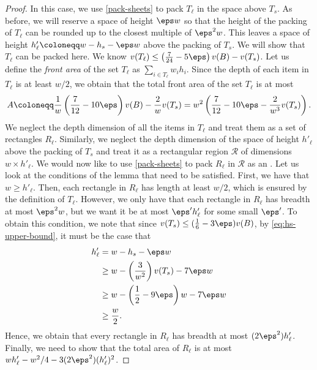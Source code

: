 \begin{proof}
In this case, we use \cref{pack-sheets} to pack $T_\ell$ in the space above $T_s$.
As before, we will reserve a space of height $\eps w$ so that the height of the packing of $T_{\ell}$
can be rounded up to the closest multiple of $\eps^2 w$. This leaves a space of height 
$h'_{\ell}\coloneqq w-h_s-\eps w$ above the packing of $T_s$. We will show that $T_{\ell}$ can be packed here.
We know $v(T_\ell)\le \left(\frac{7}{24}-5\eps\right)v(B)-v(T_s)$.
Let us define the \emph{front area} of the set $T_\ell$ as $\sum_{i\in T_\ell}w_ih_i$.
Since the depth of each item in $T_\ell$ is at least $w/2$, we obtain that the total front area of the set $T_\ell$
is at most 
\begin{align*}
    A\coloneqq \frac{1}{w}\left(\frac{7}{12}-10\eps\right)v(B)-\frac{2}{w}v(T_s)=w^2\left(\frac{7}{12}-10\eps-\frac{2}{w^3}v(T_s)\right).
\end{align*}
We neglect the depth dimension of all the items in $T_\ell$ and treat them as a set of rectangles $R_\ell$. Similarly,
we neglect the depth dimension of the space of height $h'_{\ell}$ above the packing of $T_s$ and treat it as a rectangular region $\mathcal R$
of dimensions $w\times h'_{\ell}$.
We would now like to use \cref{pack-sheets} to pack $R_{\ell}$ in $\mathcal R$ as an \LContainer.
Let us look at the conditions of the lemma that need to be satisfied.
First, we have that $w\ge h'_{\ell}$. Then, each rectangle in $R_\ell$ has length at least $w/2$, which is ensured by the definition of $T_{\ell}$.
However, we only have that each rectangle in $R_{\ell}$ has breadth at most $\eps^2 w$, but we want it be at most $\eps' h'_{\ell}$ for some small $\eps'$.
To obtain this condition, we note that since $v(T_s)\le (\frac16-3\eps)v(B)$, by \cref{eq:hs-upper-bound}, it must be the case that
\begin{align}
    h'_{\ell}&=w-h_s-\eps w\nonumber\\    
        &\ge w-\left(\frac{3}{w^2}\right)v(T_s)-7\eps w\label{eq:hl-lower-bound}\\
        &\ge w-\left(\frac12-9\eps\right)w-7\eps w\nonumber\\
        &\ge \frac{w}{2}.\nonumber
\end{align}
Hence, we obtain that every rectangle in $R_{\ell}$ has breadth at most $(2\eps^2)h'_{\ell}$.
Finally, we need to show that the total area of $R_{\ell}$ is at most $wh'_{\ell}-w^2/4-3(2\eps^2)(h'_{\ell})^2$.

\end{proof}
